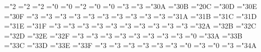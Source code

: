\mathchardef\boxdot="2
\mathchardef\boxplus="2
\mathchardef\boxtimes="2
\mathchardef\square="0
\mathchardef\blacksquare="0
\mathchardef\centerdot="2
\mathchardef\lozenge="0
\mathchardef\blacklozenge="0
\mathchardef\circlearrowright="3
\mathchardef\circlearrowleft="3
\mathchardef\rightleftharpoons="3\msx@0A
\mathchardef\leftrightharpoons="3\msx@0B
\mathchardef\boxminus="2\msx@0C
\mathchardef\Vdash="3\msx@0D
\mathchardef\Vvdash="3\msx@0E
\mathchardef\vDash="3\msx@0F
\mathchardef\twoheadrightarrow="3
\mathchardef\twoheadleftarrow="3
\mathchardef\leftleftarrows="3
\mathchardef\rightrightarrows="3
\mathchardef\upuparrows="3
\mathchardef\downdownarrows="3
\mathchardef\upharpoonright="3
\let\restriction=\upharpoonright
\mathchardef\downharpoonright="3
\mathchardef\upharpoonleft="3
\mathchardef\downharpoonleft="3
\mathchardef\rightarrowtail="3\msx@1A
\mathchardef\leftarrowtail="3\msx@1B
\mathchardef\leftrightarrows="3\msx@1C
\mathchardef\rightleftarrows="3\msx@1D
\mathchardef\Lsh="3\msx@1E
\mathchardef\Rsh="3\msx@1F
\mathchardef\rightsquigarrow="3
\mathchardef\leftrightsquigarrow="3
\mathchardef\looparrowleft="3
\mathchardef\looparrowright="3
\mathchardef\circeq="3
\mathchardef\succsim="3
\mathchardef\gtrsim="3
\mathchardef\gtrapprox="3
\mathchardef\multimap="3
\mathchardef\therefore="3
\mathchardef\because="3\msx@2A
\mathchardef\doteqdot="3\msx@2B
\let\Doteq=\doteqdot
\mathchardef\triangleq="3\msx@2C
\mathchardef\precsim="3\msx@2D
\mathchardef\lesssim="3\msx@2E
\mathchardef\lessapprox="3\msx@2F
\mathchardef\eqslantless="3
\mathchardef\eqslantgtr="3
\mathchardef\curlyeqprec="3
\mathchardef\curlyeqsucc="3
\mathchardef\preccurlyeq="3
\mathchardef\leqq="3
\mathchardef\leqslant="3
\mathchardef\lessgtr="3
\mathchardef\backprime="0
\mathchardef\risingdotseq="3\msx@3A
\mathchardef\fallingdotseq="3\msx@3B
\mathchardef\succcurlyeq="3\msx@3C
\mathchardef\geqq="3\msx@3D
\mathchardef\geqslant="3\msx@3E
\mathchardef\gtrless="3\msx@3F
\mathchardef\sqsubset="3
\mathchardef\sqsupset="3
\mathchardef\vartriangleright="3
\mathchardef\vartriangleleft="3
\mathchardef\trianglerighteq="3
\mathchardef\trianglelefteq="3
\mathchardef\bigstar="0
\mathchardef\between="3
\mathchardef\blacktriangledown="0
\mathchardef\blacktriangleright="3
\mathchardef\blacktriangleleft="3\msx@4A
